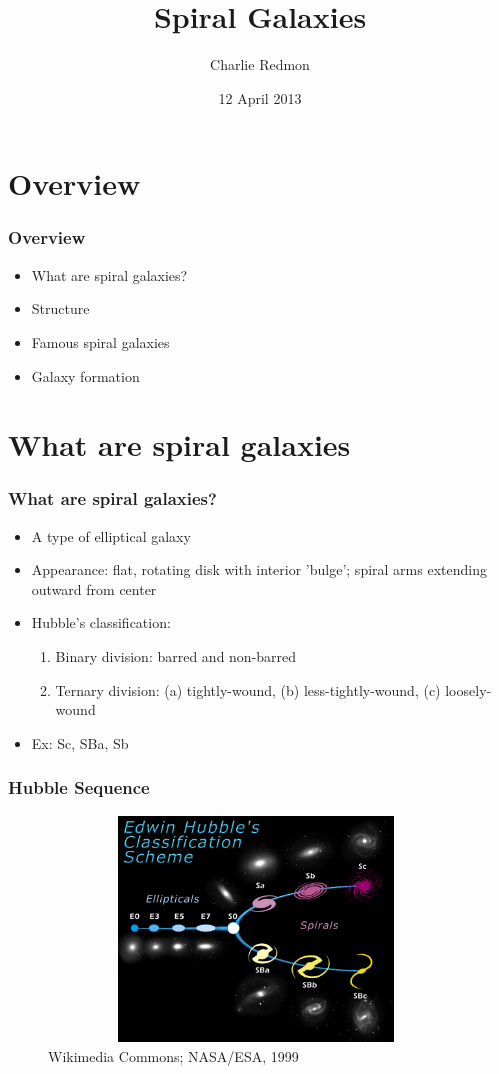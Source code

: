 \documentclass{beamer}
\title{Spiral Galaxies}
\author{Charlie Redmon}
\date{12 April 2013}
\begin{document}
\begin{frame}
\titlepage
\end{frame}

\section{Overview}

\begin{frame}[t]
\frametitle{Overview}

	\begin{itemize}
	\item<2->What are spiral galaxies?
	\item<3->Structure
	\item<4->Famous spiral galaxies
	\item<5->Galaxy formation
	\end{itemize}
\end{frame}

\section{What are spiral galaxies}

\begin{frame}[t]
\frametitle{What are spiral galaxies?}
	\begin{itemize}
	\item<2->A type of elliptical galaxy
	\item<3->Appearance: flat, rotating disk with interior 'bulge'; spiral arms extending outward from center
	\item<4->Hubble's classification:
		\begin{enumerate}
		\item<5->Binary division: barred and non-barred
		\item<6->Ternary division: (a) tightly-wound, (b) less-tightly-wound, (c) loosely-wound
		\end{enumerate}
	\item<7->Ex: Sc, SBa, Sb
	\end{itemize}
\end{frame}



\begin{frame}
\frametitle{Hubble Sequence}
\begin{figure}
\includegraphics[width=110mm, height=60mm]{HubbleTuningFork.jpg}
\caption{Wikimedia Commons; NASA/ESA, 1999}
\end{figure}
\end{frame}
\end{document}
